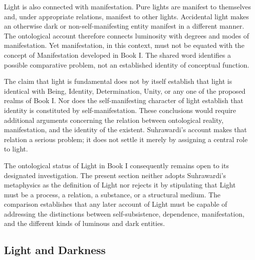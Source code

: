 \label{para:VS.B01.P01.C08.S14.SS05.P003}

Light is also connected with manifestation. Pure lights
are manifest to themselves and, under appropriate
relations, manifest to other lights. Accidental light
makes an otherwise dark or non-self-manifesting entity
manifest in a different manner. The ontological account
therefore connects luminosity with degrees and modes
of manifestation. Yet manifestation, in this context,
must not be equated with the concept of Manifestation
developed in Book I. The shared word identifies a
possible comparative problem, not an established
identity of conceptual function.

\label{para:VS.B01.P01.C08.S14.SS05.P004}

The claim that light is fundamental does not by itself
establish that light is identical with Being, Identity,
Determination, Unity, or any one of the proposed realms
of Book I. Nor does the self-manifesting character of
light establish that identity is constituted by
self-manifestation. These conclusions would require
additional arguments concerning the relation between
ontological reality, manifestation, and the identity
of the existent. Suhrawardi's account makes that relation
a serious problem; it does not settle it merely by
assigning a central role to light.

\label{para:VS.B01.P01.C08.S14.SS05.P005}

The ontological status of Light in Book I consequently
remains open to its designated investigation. The
present section neither adopts Suhrawardi's metaphysics
as the definition of Light nor rejects it by stipulating
that Light must be a process, a relation, a substance,
or a structural medium. The comparison establishes
that any later account of Light must be capable of
addressing the distinctions between self-subsistence,
dependence, manifestation, and the different kinds
of luminous and dark entities.


\subsection{Light and Darkness}
\label{sec:ch08-s14-ss06}

